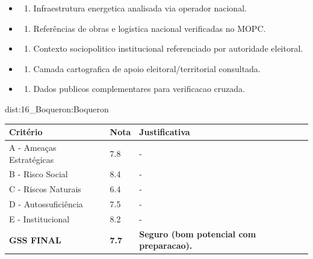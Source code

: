 {\begin{itemize}
\item
  \begin{enumerate}
  \def\labelenumi{\arabic{enumi})}
  \setcounter{enumi}{7}
  \tightlist
  \item
    Infraestrutura energetica analisada via operador nacional.
  \end{enumerate}
\item
  \begin{enumerate}
  \def\labelenumi{\arabic{enumi})}
  \setcounter{enumi}{8}
  \tightlist
  \item
    Referências de obras e logistica nacional verificadas no MOPC.
  \end{enumerate}
\item
  \begin{enumerate}
  \def\labelenumi{\arabic{enumi})}
  \setcounter{enumi}{9}
  \tightlist
  \item
    Contexto sociopolitico institucional referenciado por autoridade
    eleitoral.
  \end{enumerate}
\item
  \begin{enumerate}
  \def\labelenumi{\arabic{enumi})}
  \setcounter{enumi}{10}
  \tightlist
  \item
    Camada cartografica de apoio eleitoral/\allowbreak territorial consultada.
  \end{enumerate}
\item
  \begin{enumerate}
  \def\labelenumi{\arabic{enumi})}
  \setcounter{enumi}{11}
  \tightlist
  \item
    Dados publicos complementares para verificacao cruzada.
  \end{enumerate}
\end{itemize}}{dist:16_Boqueron:Boqueron}
\begin{table}[ht!]
\small \begin{tabular}{p{3.0cm}p{0.8cm}p{6.0cm}} \toprule
\textbf{Critério} & \textbf{Nota} & \textbf{Justificativa} \\ \midrule
A - Ameaças Estratégicas & 7.8 & - \\
B - Risco Social & 8.4 & - \\
C - Riscos Naturais & 6.4 & - \\
D - Autossuficiência & 7.5 & - \\
E - Institucional & 8.2 & - \\
\midrule \textbf{GSS FINAL} & \textbf{7.7} & \textbf{Seguro (bom potencial com preparacao).} \\ \bottomrule \end{tabular}
\end{table}
